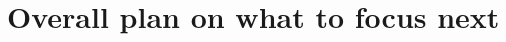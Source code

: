 \documentclass[a4paper,11pt]{article}
\begin{document}
	\section*{Overall plan on what to focus next}

	\newpage
	





	
	
\end{document}
